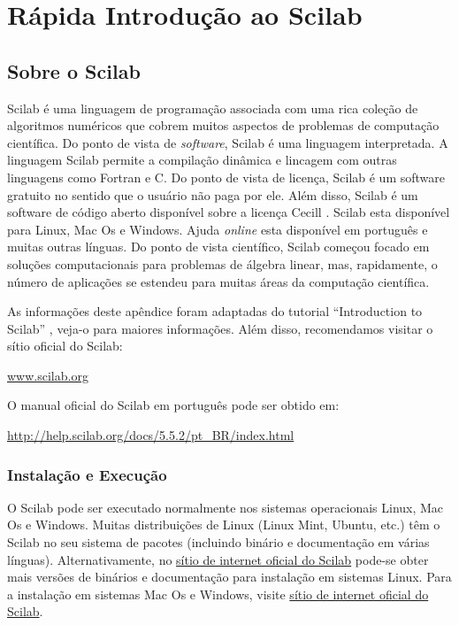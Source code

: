 \documentclass[main.tex]{subfiles}
\begin{document}
\chapter{Rápida Introdução ao Scilab}\label{cap:scilab}

\section{Sobre o Scilab}

Scilab é uma linguagem de programação associada com uma rica coleção de algoritmos numéricos que cobrem muitos aspectos de problemas de computação científica. Do ponto de vista de {\it software}, Scilab é uma linguagem interpretada. A linguagem Scilab permite a compilação dinâmica e lincagem com outras linguagens como Fortran e C. Do ponto de vista de licença, Scilab é um software gratuito no sentido que o usuário não paga por ele. Além disso, Scilab é um software de código aberto disponível sobre a licença Cecill \cite{Cecill}. Scilab esta disponível para Linux, Mac Os e Windows. Ajuda {\it online} esta disponível em português e muitas outras línguas. Do ponto de vista científico, Scilab começou focado em soluções computacionais para problemas de álgebra linear, mas, rapidamente, o número de aplicações se estendeu para muitas áreas da computação científica.

As informações deste apêndice foram adaptadas do tutorial ``Introduction to Scilab'' \cite{Scilab15}, veja-o para maiores informações. Além disso, recomendamos visitar o sítio oficial do Scilab:
\begin{center}
  \url{www.scilab.org}
\end{center}

O manual oficial do Scilab em português pode ser obtido em:
\begin{center}
  \url{http://help.scilab.org/docs/5.5.2/pt_BR/index.html}
\end{center}

\subsection{Instalação e Execução}

O Scilab pode ser executado normalmente nos sistemas operacionais Linux, Mac Os e Windows. Muitas distribuições de Linux (Linux Mint, Ubuntu, etc.) têm o Scilab no seu sistema de pacotes (incluindo binário e documentação em várias línguas). Alternativamente, no \href{www.scilab.org}{sítio de internet oficial do Scilab} pode-se obter mais versões de binários e documentação para instalação em sistemas Linux. Para a instalação em sistemas Mac Os e Windows, visite \href{www.scilab.org}{sítio de internet oficial do Scilab}.
\end{document}
